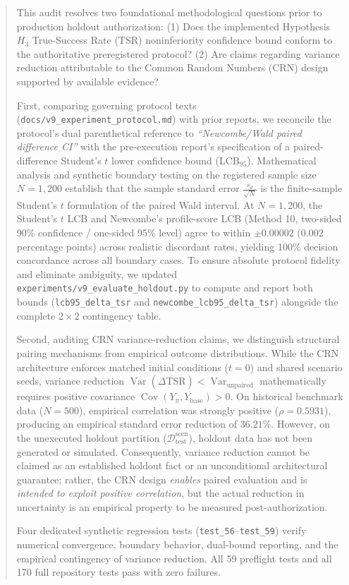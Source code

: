 \documentclass[10pt,a4paper]{article}
\begin{document}
\begin{abstract}
\noindent This audit resolves two foundational methodological questions prior to production holdout authorization: (1) Does the implemented Hypothesis $H_3$ True-Success Rate (TSR) noninferiority confidence bound conform to the authoritative preregistered protocol? (2) Are claims regarding variance reduction attributable to the Common Random Numbers (CRN) design supported by available evidence?

First, comparing governing protocol texts (\texttt{docs/v9\_experiment\_protocol.md}) with prior reports, we reconcile the protocol's dual parenthetical reference to \textit{``Newcombe/Wald paired difference CI''} with the pre-execution report's specification of a paired-difference Student's $t$ lower confidence bound ($\mathrm{LCB}_{95}$). Mathematical analysis and synthetic boundary testing on the registered sample size $N = 1,200$ establish that the sample standard error $\frac{s_d}{\sqrt{N}}$ is the finite-sample Student's $t$ formulation of the paired Wald interval. At $N = 1,200$, the Student's $t$ LCB and Newcombe's profile-score LCB (Method 10, two-sided 90\% confidence / one-sided 95\% level) agree to within $\pm 0.00002$ ($0.002$ percentage points) across realistic discordant rates, yielding 100\% decision concordance across all boundary cases. To ensure absolute protocol fidelity and eliminate ambiguity, we updated \texttt{experiments/v9\_evaluate\_holdout.py} to compute and report both bounds (\texttt{lcb95\_delta\_tsr} and \texttt{newcombe\_lcb95\_delta\_tsr}) alongside the complete $2 \times 2$ contingency table.

Second, auditing CRN variance-reduction claims, we distinguish structural pairing mechanisms from empirical outcome distributions. While the CRN architecture enforces matched initial conditions ($t=0$) and shared scenario seeds, variance reduction $\operatorname{Var}(\overline{\Delta\mathrm{TSR}}) < \operatorname{Var}_{\text{unpaired}}$ mathematically requires positive covariance $\operatorname{Cov}(Y_{\pi}, Y_{\text{base}}) > 0$. On historical benchmark data ($N = 500$), empirical correlation was strongly positive ($\rho = 0.5931$), producing an empirical standard error reduction of $36.21\%$. However, on the unexecuted holdout partition ($\mathcal{D}_{\text{test}}^{\text{scen}}$), holdout data has not been generated or simulated. Consequently, variance reduction cannot be claimed as an established holdout fact or an unconditional architectural guarantee; rather, the CRN design \textit{enables} paired evaluation and is \textit{intended to exploit positive correlation}, but the actual reduction in uncertainty is an empirical property to be measured post-authorization.

Four dedicated synthetic regression tests (\texttt{test\_56}--\texttt{test\_59}) verify numerical convergence, boundary behavior, dual-bound reporting, and the empirical contingency of variance reduction. All 59 preflight tests and all 170 full repository tests pass with zero failures.
\end{abstract}
\end{document}
